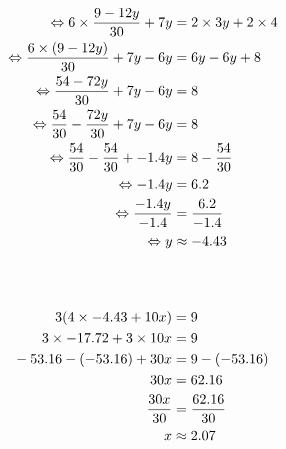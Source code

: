 \documentclass{article}%
\begin{document}
\begin{align*}%
\ \Leftrightarrow 6 \times \frac{9 - 12y}{30} + 7y &= 2 \times 3y + 2 \times 4 \\%
\vspace{5mm}%
\newline%
\  \Leftrightarrow \frac{6 \times (9 - 12y)}{30} + 7y - 6y &= 6y - 6y + 8 \\%
\vspace{5mm}%
\newline%
\  \Leftrightarrow \frac{54 - 72y}{30} + 7y - 6y &= 8 \\%
\vspace{5mm}%
\newline%
\  \Leftrightarrow \frac{54}{30} - \frac{72y}{30} + 7y -6y &= 8 \\%
\vspace{5mm}%
\newline%
\  \Leftrightarrow \frac{54}{30} - \frac{54}{30} + -1.4y &= 8 - \frac{54}{30} \\%
\vspace{5mm}%
\newline%
\  \Leftrightarrow -1.4y &= 6.2 \\%
\vspace{5mm}%
\newline%
\  \Leftrightarrow \frac{-1.4y}{-1.4} &= \frac{6.2}{-1.4} \\%
\vspace{5mm}%
\newline%
\  \Leftrightarrow y &\approx -4.43 \\%
\vspace{5mm}%
\newline%
\end{align*}%
\ \\%
\vspace{5mm}%
\newline%
\begin{align*}%
\  3(4 \times -4.43 + 10x) &= 9 \\%
\vspace{5mm}%
\newline%
\  3 \times -17.72 + 3 \times 10x &= 9 \\%
\vspace{5mm}%
\newline%
\  -53.16 - (-53.16) +  30x &= 9 -(-53.16)\\%
\vspace{5mm}%
\newline%
\  30x &= 62.16\\%
\vspace{5mm}%
\newline%
\  \frac{30x}{30} &= \frac{62.16}{30}\\%
\vspace{5mm}%
\newline%
\  x &\approx 2.07\\%
\vspace{5mm}%
\newline%
\end{align*}

%
\end{document}
